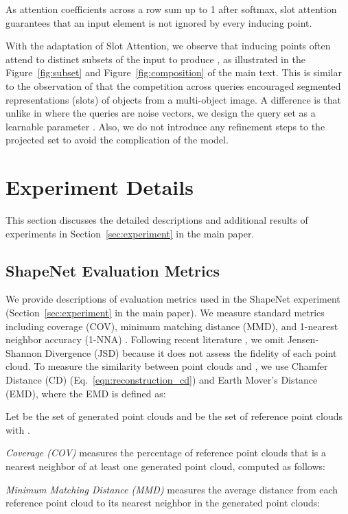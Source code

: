 \documentclass[final]{arxiv/cvpr}
\begin{document}
As attention coefficients across a row sum up to 1 after softmax, slot attention guarantees that an input element is not ignored by every inducing point.

With the adaptation of Slot Attention, we observe that inducing points often attend to distinct subsets of the input to produce , as illustrated in the Figure~\ref{fig:subset} and Figure~\ref{fig:composition} of the main text.
This is similar to the observation of \cite{locatello2020objectcentric} that the competition across queries encouraged segmented representations (slots) of objects from a multi-object image.
A difference is that unlike in \cite{locatello2020objectcentric} where the queries are noise vectors, we design the query set as a learnable parameter .
Also, we do not introduce any refinement steps to the projected set  to avoid the complication of the model.

\section{Experiment Details}
This section discusses the detailed descriptions and additional results of experiments in Section~\ref{sec:experiment} in the main paper.

\subsection{ShapeNet Evaluation Metrics}
\label{appendix:metrics}
We provide descriptions of evaluation metrics used in the ShapeNet experiment (Section~\ref{sec:experiment} in the main paper).
We measure standard metrics including coverage (COV), minimum matching distance (MMD), and 1-nearest neighbor accuracy (1-NNA) \cite{achlioptas2018learning, yang2019pointflow}.
Following recent literature \cite{kim2020softflow}, we omit Jensen-Shannon Divergence (JSD) \cite{achlioptas2018learning} because it does not assess the fidelity of each point cloud. To measure the similarity  between point clouds  and , we use Chamfer Distance (CD) (Eq.~\eqref{eqn:reconstruction_cd}) and Earth Mover's Distance (EMD), where the EMD is defined as:


Let  be the set of generated point clouds and  be the set of reference point clouds with .

\emph{Coverage (COV)} measures the percentage of reference point clouds that is a nearest neighbor of at least one generated point cloud, computed as follows:


\emph{Minimum Matching Distance (MMD)} measures the average distance from each reference point cloud to its nearest neighbor in the generated point clouds:
\end{document}
